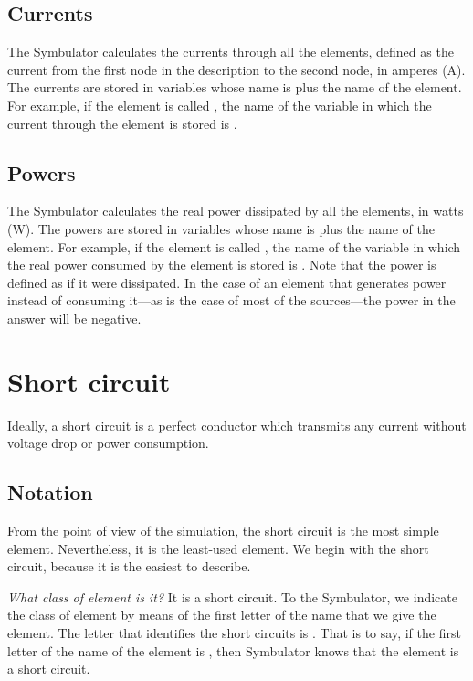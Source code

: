 \subsection{Currents}

The Symbulator calculates the currents through all the elements,
defined as the current from the first node in the description to the
second node, in amperes (A). The currents are stored in variables
whose name is  plus the name of the element. For example, if
the element is called , the name of the variable in which
the current through the element is stored is .

\subsection{Powers}

The Symbulator calculates the real power dissipated by all the
elements, in watts (W). The powers are stored in variables whose
name is  plus the name of the element. For example, if the
element is called , the name of the variable in which the
real power consumed by the element is stored is . Note
that the power is defined as if it were dissipated. In the case of
an element that generates power instead of consuming it---as is the
case of most of the sources---the power in the answer will be
negative.

\section{Short circuit}

Ideally, a short circuit is a perfect conductor which transmits any
current without voltage drop or power consumption.

\subsection{Notation}

From the point of view of the simulation, the short circuit is the
most simple element. Nevertheless, it is the least-used element. We
begin with the short circuit, because it is the easiest to describe.

\emph{What class of element is it?} It is a short circuit. To the
Symbulator, we indicate the class of element by means of the first
letter of the name that we give the element. The letter that
identifies the short circuits is . That is to say, if the
first letter of the name of the element is , then Symbulator
knows that the element is a short circuit.

